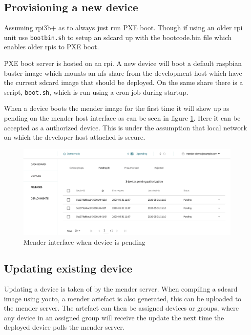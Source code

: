 \documentclass[../../main.tex]{subfiles}
\begin{document}
\subsection{Provisioning a new device}%
\label{sub:provisioning_a_new_device}
Assuming rpi3b+ as to always just run PXE boot. Though if using an older rpi unit use 
\texttt{bootbin.sh} to setup an sdcard up with the bootcode.bin file which
enables older rpis to PXE boot.

PXE boot server is hosted on an rpi. A new device will boot a default raspbian buster image
which mounts an nfs share from the development host which have the current sdcard image that 
should be deployed. On the same share there is a script, \texttt{boot.sh}, which is
run using a cron job during startup.\\



When a device boots the mender image for the first time it will show up as pending on the mender
host interface as can be seen in figure \ref{fig:mender-ui-pending}.
Here it can be accepted as a authorized device.
This is under the assumption that local network on which the developer host attached is secure.

\begin{figure}[h]
	\centering
	\includegraphics[width=1\linewidth]{img/mender-ui-pending-edited.pdf}
	\caption{Mender interface when device is pending}%
	\label{fig:mender-ui-pending}
\end{figure}

\subsection{Updating existing device}%
\label{sub:updating_existing_device}

Updating a device is taken of by the mender server. When compiling a sdcard image using yocto,
a mender artefact is also generated, this can be uploaded to the mender server.
The artefact can then be assigned devices or groups, where any device in an assigned group will
receive the update the next time the deployed device polls the mender server.
\end{document}
